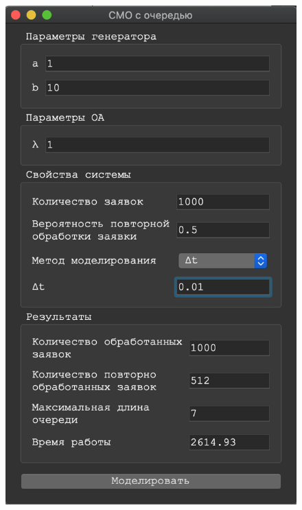 \documentclass[a4paper,12pt]{article}
\begin{document}
\begin{figure}[h!]
\begin{minipage}[b]{0.32\textwidth}
			\includegraphics[width=\textwidth]{deltat_3_3.png}
		\end{minipage}
		\label{ris:deltat_3}
	\end{figure}
	
\end{document}

